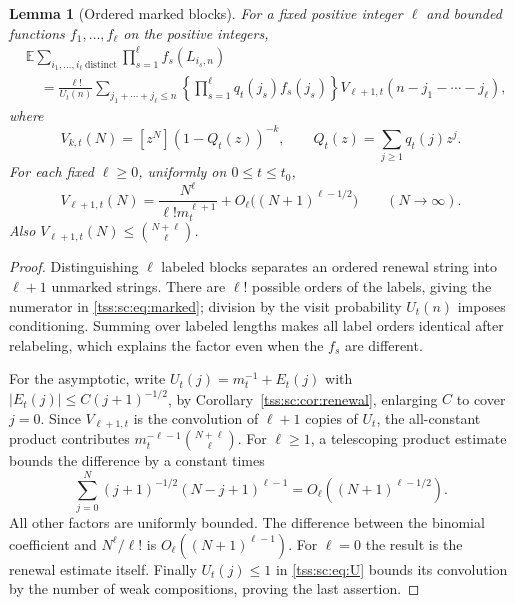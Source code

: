 \documentclass[11pt]{article}
\newtheorem{lemma}[theorem]{Lemma}
\theoremstyle{remark}\newtheorem{remark}[theorem]{Remark}
\theoremstyle{definition}\newtheorem{definition}[theorem]{Definition}
\newcommand{\E}{\mathbb E}
\begin{document}
\begin{lemma}[Ordered marked blocks]\label{tss:sc:lem:marked}
For a fixed positive integer $\ell$ and bounded functions $f_1,\ldots,f_\ell$ on the positive integers,
\begin{equation}\label{tss:sc:eq:marked}
\begin{split}
 &\E\sum_{i_1,\ldots,i_\ell\ \mathrm{distinct}}
             \prod_{s=1}^\ell f_s(L_{i_s,n})\\
 &\quad=\frac{\ell!}{U_t(n)}
 \sum_{j_1+\cdots+j_\ell\leq n}
  \left\{\prod_{s=1}^\ell q_t(j_s)f_s(j_s)\right\}
  V_{\ell+1,t}(n-j_1-\cdots-j_\ell),
\end{split}
\end{equation}
where
\begin{equation}\label{tss:sc:eq:V}
 V_{k,t}(N)=[z^N](1-Q_t(z))^{-k},\qquad
 Q_t(z)=\sum_{j\geq1}q_t(j)z^j.
\end{equation}
For each fixed $\ell\geq0$, uniformly on $0\leq t\leq t_0$,
\begin{equation}\label{tss:sc:eq:Vasymp}
 V_{\ell+1,t}(N)=\frac{N^\ell}{\ell!m_t^{\ell+1}}
              +O_\ell\bigl((N+1)^{\ell-1/2}\bigr)\qquad(N\to\infty).
\end{equation}
Also $V_{\ell+1,t}(N)\leq\binom{N+\ell}{\ell}$.
\end{lemma}
\begin{proof}
Distinguishing $\ell$ labeled blocks separates an ordered renewal string into $\ell+1$ unmarked strings. There are $\ell!$ possible orders of the labels, giving the numerator in \eqref{tss:sc:eq:marked}; division by the visit probability $U_t(n)$ imposes conditioning. Summing over labeled lengths makes all label orders identical after relabeling, which explains the factor even when the $f_s$ are different.

For the asymptotic, write $U_t(j)=m_t^{-1}+E_t(j)$ with
$|E_t(j)|\leq C(j+1)^{-1/2}$, by Corollary~\ref{tss:sc:cor:renewal}, enlarging $C$ to cover $j=0$. Since $V_{\ell+1,t}$ is the convolution of $\ell+1$ copies of $U_t$, the all-constant product contributes
$m_t^{-\ell-1}\binom{N+\ell}{\ell}$. For $\ell\geq1$, a telescoping product estimate bounds the difference by a constant times
\[
 \sum_{j=0}^N (j+1)^{-1/2}(N-j+1)^{\ell-1}
 =O_\ell((N+1)^{\ell-1/2}).
\]
All other factors are uniformly bounded. The difference between the binomial coefficient and $N^\ell/\ell!$ is $O_\ell((N+1)^{\ell-1})$. For $\ell=0$ the result is the renewal estimate itself. Finally $U_t(j)\leq1$ in \eqref{tss:sc:eq:U} bounds its convolution by the number of weak compositions, proving the last assertion.
\end{proof}
\end{document}
